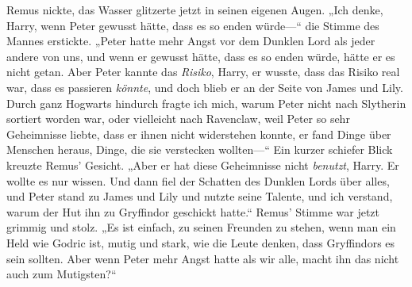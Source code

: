 Remus nickte, das Wasser glitzerte jetzt in seinen eigenen Augen. „Ich denke, Harry, wenn Peter gewusst hätte, dass es so enden würde—“ die Stimme des Mannes erstickte. „Peter hatte mehr Angst vor dem Dunklen Lord als jeder andere von uns, und wenn er gewusst hätte, dass es so enden würde, hätte er es nicht getan. Aber Peter kannte das \emph{Risiko}, Harry, er wusste, dass das Risiko real war, dass es passieren \emph{könnte}, und doch blieb er an der Seite von James und Lily. Durch ganz Hogwarts hindurch fragte ich mich, warum Peter nicht nach Slytherin sortiert worden war, oder vielleicht nach Ravenclaw, weil Peter so sehr Geheimnisse liebte, dass er ihnen nicht widerstehen konnte, er fand Dinge über Menschen heraus, Dinge, die sie verstecken wollten—“ Ein kurzer schiefer Blick kreuzte Remus’ Gesicht. „Aber er hat diese Geheimnisse nicht \emph{benutzt}, Harry. Er wollte es nur wissen. Und dann fiel der Schatten des Dunklen Lords über alles, und Peter stand zu James und Lily und nutzte seine Talente, und ich verstand, warum der Hut ihn zu Gryffindor geschickt hatte.“ Remus’ Stimme war jetzt grimmig und stolz. „Es ist einfach, zu seinen Freunden zu stehen, wenn man ein Held wie Godric ist, mutig und stark, wie die Leute denken, dass Gryffindors es sein sollten. Aber wenn Peter mehr Angst hatte als wir alle, macht ihn das nicht auch zum Mutigsten?“

